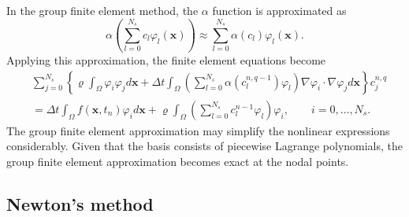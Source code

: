 \documentclass[twoside]{article}
\begin{document}
In the group finite element method, the $\alpha $ function is approximated as
\begin{equation}
  \alpha\left( \sum_{l=0}^{N_{s}}c_{l}\varphi_{l}(\mathbf{x}) \right) \approx \sum_{l = 0}^{N_{s}}\alpha(c_{l})\varphi_{l}(\mathbf{x}).
\end{equation}
Applying this approximation, the finite element equations become 
\begin{align}
  & \sum_{j=0}^{N_{s}} \left\{ \varrho \int_{\Omega }\varphi_{i}\varphi_{j}d\mathbf{x} + \Delta t \int_{\Omega } \left( \sum_{l=0}^{N_{s}}\alpha(c_{l}^{n, q-1})\varphi_{l}\right) \nabla \varphi_{i}\cdot \nabla \varphi_{j}d\mathbf{x} \right\}c_{j}^{n, q} \nonumber \\
  & = \Delta t \int_{\Omega }f(\mathbf{x}, t_{n})\varphi_{i}d\mathbf{x} + \varrho \int_{\Omega }\left( \sum_{l=0}^{N_{s}}c_{l}^{n-1}\varphi_{l}\right)\varphi_{i}, \qquad i = 0, \dots , N_{s}.
\end{align}
The group finite element approximation may simplify the nonlinear expressions considerably. Given that the basis consists of piecewise Lagrange polynomials, the group finite element approximation becomes exact at the nodal points. 

\subsection{Newton's method}
\end{document}

